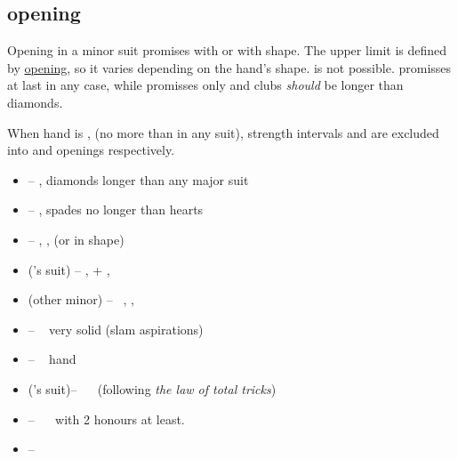 \subsection{\ctr{1\protect\minor} opening}
\label{subsec:1min-op}

Opening in a minor suit promises  with  or  with \bal\/ shape. The upper limit
is defined by \hyperref[subsec:2c-op]{\ctr{2\c} opening}, so it varies depending on the hand's shape. 
is not possible. \ctr{1\d} promisses at last  in any case, while \ctr{1\c} promisses only 
and clubs \emph{should} be longer than diamonds.

When hand is \bal, (no more than  in any suit), strength intervals  and  are
excluded into \ctr{1\nt} and \ctr{2\nt} openings respectively.

\begin{itemize}
  \newcommand{\nomajor}[1]{\no\ \suit{#1+}{\major}}

  \item \ctr{1\d} --  , diamonds longer than any major suit
  \item \ctr{1\major} --  , spades no longer than hearts
  \item \ctr{1\nt} -- \nat, ,  (or  in \bal\/ shape)
  \item \ctr{2\minor} (\opn's suit) -- \semi\nat, \inv+ , \nomajor{4}
  \item \ctr{2\minor} (other minor) -- \nat\ \gf, , \nomajor{5}
  \item \ctr{2\major} -- \nat\ \gf\/ very solid  (slam aspirations)
  \item \ctr{2\nt} -- \nat\ \inv \bal\/ hand
  \item \ctr{3\minor} (\opn's suit)-- \nat\ \preempt\  (following \emph{the law of total tricks})
  \item {} -- \nat\ \inv\  with 2 honours at least.
  \item \ctr{3\nt} -- \so
\end{itemize}
